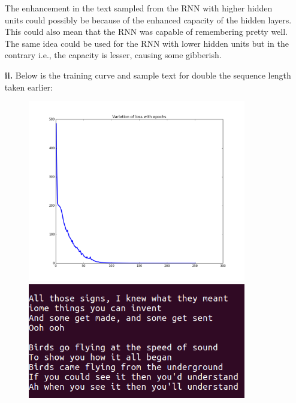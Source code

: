 \documentclass{article}
\begin{document}
\begin{flushleft}
\begin{itemize}
The enhancement in the text sampled from the RNN with higher hidden units could possibly be because of the enhanced capacity of the hidden layers. This could also mean that the RNN was capable of remembering pretty well. The same idea could be used for the RNN with lower hidden units but in the contrary i.e., the capacity is lesser, causing some gibberish.
\newpage
\item [\textbf{ii.}]
Below is the training curve and sample text for double the sequence length taken earlier:
\begin{figure}[H]
\begin{minipage}{0.475\linewidth}
\centering
\includegraphics[width=0.9\textwidth]{RNN_training_SL2x.png}
\end{minipage}
\hfill
\begin{minipage}{0.475\linewidth}
\centering
\includegraphics[width=0.9\textwidth]{RNN_text_SL2x.png}
\end{minipage}
\end{figure}


\end{itemize}
\end{flushleft}
\end{document}
